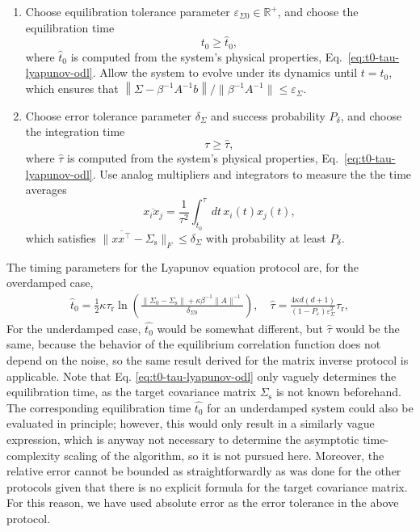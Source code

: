 \documentclass[prx,onecolumn,floatfix,longbibliography,notitlepage, nofootinbib]{revtex4-1}
\renewcommand{\geq}{\geqslant}
\renewcommand{\leq}{\leqslant}
\begin{document}
\begin{appendix}
\begin{tcolorbox}[title={Lyapunov Equation Protocol},breakable]
\begin{enumerate}
\item Choose equilibration tolerance parameter $\varepsilon_{\Sigma 0} \in \mathbb{R}^+$, and choose the equilibration time
\begin{equation}
\label{eq:UDL-eq-time}
t_0 \geq \widehat{t}_0,
\end{equation}
where $\widehat{t}_0$ is computed from the system's physical properties, Eq.~\eqref{eq:t0-tau-lyapunov-odl}. Allow the system to evolve under its dynamics until $t=t_0$, which ensures that $\left\|\Sigma - \beta^{-1} A^{-1} b\right\|/\|\beta^{-1}A^{-1}\| \leq \varepsilon_\Sigma$.
\item  Choose error tolerance parameter $\delta_\Sigma$ and success probability $P_\delta$, and choose the integration time
\begin{equation}
    \tau \geq \widehat{\tau},
\end{equation}
where $\widehat{\tau}$ is computed from the system's physical properties, Eq.~\eqref{eq:t0-tau-lyapunov-odl}. Use analog multipliers and integrators to measure the the time averages
\begin{equation}
    \overline{x_i x_j} = \frac{1}{\tau^2} \int_{t_0}^\tau dt\, x_i(t) x_j(t),
\end{equation}
which satisfies $\|\overline{x x^\intercal} - \Sigma_\text{s}\|_F \leq \delta_\Sigma$ with probability at least $P_\delta$.
\end{enumerate}
\end{tcolorbox}
\medskip


The timing parameters for the Lyapunov equation protocol are, for the overdamped case,
\begin{align}
\label{eq:t0-tau-lyapunov-odl}
\widehat{t}_0 =
\frac{1}{2}\kappa\tau_\text{r}\ln\left(\frac{\|\Sigma_0 - \Sigma_\text{s}\| + \kappa \beta^{-1} \|A\|^{-1}
}{\delta_{\Sigma 0}}\right),\quad
    \widehat{\tau} = \frac{4 \kappa d(d+1)}{(1-P_\varepsilon)\varepsilon_\Sigma^2}\tau_\text{r},
\end{align}
For the underdamped case, $\widehat{t_0}$ would be somewhat different, but $\widehat{\tau}$ would be the same, because the behavior of the equilibrium correlation function does not depend on the noise, so the same result derived for the matrix inverse protocol is applicable. Note that Eq. \eqref{eq:t0-tau-lyapunov-odl} only vaguely determines the equilibration time, as the target covariance matrix $\Sigma_\text{s}$ is not known beforehand. The corresponding equilibration time $\widehat{t_0}$ for an underdamped system could also be evaluated in principle; however, this would only result in a similarly vague expression, which is anyway not necessary to determine the asymptotic time-complexity scaling of the algorithm, so it is not pursued here. Moreover, the relative error cannot be bounded as straightforwardly as was done for the other protocols given that there is no explicit formula for the target covariance matrix. For this reason, we have used absolute error as the error tolerance in the above protocol.








\end{appendix}
\end{document}

